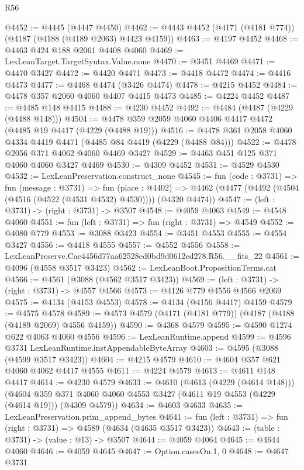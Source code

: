 \begin{lexlean}{R56}
\begin{coremodule}
@4452 := @4445 (@4447 @4450)
@4462 := @4443 @4452 (@4171 (@4181 @774)) (@4187 (@4188 (@4189 @2063) @4423 @4159))
@4463 := @4197 @4452
@4468 := @4463 @424 @188 @2061 @4408 @4060
@4469 := LexLeanTarget.TargetSyntax.Value.none
@4470 := @3451 @4469
@4471 := @4470 @3427
@4472 := @4420 @4471
@4473 := @4418 @4472
@4474 := @4416 @4473
@4477 := @4468 @4474 (@3426 @4474)
@4478 := @4215 @4452
@4484 := @4478 @357 @2060 @4060 @4407 @4415 @4473
@4485 := @4224 @4452
@4487 := @4485 @148 @4415
@4488 := @4230 @4452
@4492 := @4484 (@4487 (@4229 (@4488 @148)))
@4504 := @4478 @359 @2059 @4060 @4406 @4417 @4472 (@4485 @19 @4417 (@4229 (@4488 @19)))
@4516 := @4478 @361 @2058 @4060 @4334 @4419 @4471 (@4485 @84 @4419 (@4229 (@4488 @84)))
@4522 := @4478 @2056 @371 @4062 @4060 @4469 @3427
@4529 := @4463 @451 @125 @371 @4060 @4060 @3427 @4469
@4530 := @4309 @4452
@4531 := @4529 @4530
@4532 := LexLeanPreservation.construct_none
@4545 := fun (code : @3731) =>
  fun (message : @3731) =>
  fun (place : @4402) =>
  @4462 (@4477 (@4492 (@4504 (@4516 (@4522 (@4531 @4532) @4530)))) (@4320 @4474))
@4547 := (left : @3731) -> (right : @3731) -> @3507
@4548 := @4059 @4063
@4549 := @4548 @4060
@4551 := fun (left : @3731) => fun (right : @3731) => @4549
@4552 := @4080 @779
@4553 := @3088 @3423
@4554 := @3451 @4553
@4555 := @4554 @3427
@4556 := @4418 @4555
@4557 := @4552 @4556
@4558 := LexLeanPreserve.Cae4456d77aa62528ed0bd9d0612cd278.R56.__fits_22
@4561 := @4096 (@4558 @3517 @3423)
@4562 := LexLeanBoot.PropositionTerms.cat
@4566 := @4561 (@3088 (@4562 @3517 @3423))
@4569 := (left : @3731) -> (right : @3731) -> @4557 @4566
@4573 := @4126 @779 @4556 @4566 @2069
@4575 := @4134 (@4153 @4553)
@4578 := @4134 (@4156 @4417) @4159
@4579 := @4575 @4578
@4589 := @4573 @4579 (@4171 (@4181 @779)) (@4187 (@4188 (@4189 @2069) @4556 @4159))
@4590 := @4368 @4579
@4595 := @4590 @1274 @622 @4063 @4060 @4556
@4596 := LexLeanRuntime.append
@4599 := @4596 @3731 LexLeanRuntime.instAppendableByteArray
@4603 := @4595 (@3088 (@4599 @3517 @3423))
@4604 := @4215 @4579
@4610 := @4604 @357 @621 @4060 @4062 @4417 @4555
@4611 := @4224 @4579
@4613 := @4611 @148 @4417
@4614 := @4230 @4579
@4633 := @4610
    (@4613 (@4229 (@4614 @148)))
    (@4604 @359 @371 @4060 @4060 @4553 @3427 (@4611 @19 @4553 (@4229 (@4614 @19))) (@4309 @4579))
@4634 := @4603 @4633
@4635 := LexLeanPreservation.prim_append_bytes
@4641 := fun (left : @3731) => fun (right : @3731) => @4589 (@4634 (@4635 @3517 @3423))
@4643 := (table : @3731) -> (value : @13) -> @3507
@4644 := @4059 @4064
@4645 := @4644 @4060
@4646 := @4059 @4645
@4647 := Option.casesOn.{1, 0}
@4648 := @4647 @3731

\end{coremodule}
\end{lexlean}
